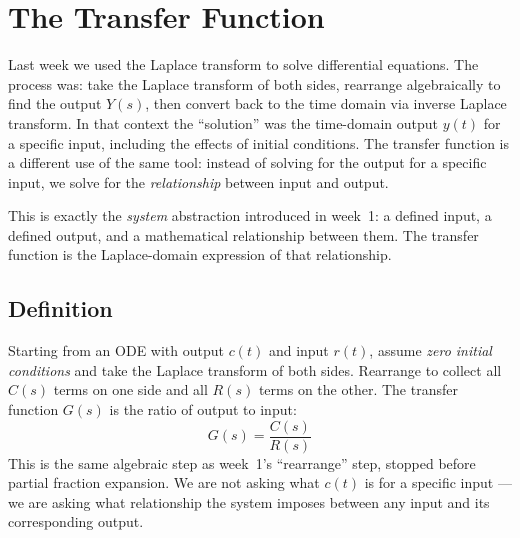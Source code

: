 \documentclass[../../book.tex]{subfiles}
\begin{document}

\section{The Transfer Function}
\label{sec:tf}

Last week we used the Laplace transform to solve differential equations.  The
process was: take the Laplace transform of both sides, rearrange algebraically
to find the output $Y(s)$, then convert back to the time domain via inverse Laplace transform.  In that
context the ``solution'' was the time-domain output $y(t)$ for a specific input,
including the effects of initial conditions.  The transfer function is a
different use of the same tool: instead of solving for the output for a specific
input, we solve for the \emph{relationship} between input and output.

This is exactly the \emph{system} abstraction introduced in week~1: a defined
input, a defined output, and a mathematical relationship between them.  The
transfer function is the Laplace-domain expression of that relationship.

\subsection{Definition}
\label{sec:tf_def}

Starting from an ODE with output $c(t)$ and input $r(t)$, assume
\emph{zero initial conditions} and take the Laplace transform of both sides.
Rearrange to collect all $C(s)$ terms on one side and all $R(s)$ terms on
the other.  The transfer function $G(s)$ is the ratio of output to input:
\begin{equation}
  G(s) = \frac{C(s)}{R(s)}
  \label{eq:tf_def}
\end{equation}
This is the same algebraic step as week~1's ``rearrange'' step, stopped before
partial fraction expansion.  We are not asking what $c(t)$ is for a specific
input --- we are asking what relationship the system imposes between any input
and its corresponding output.
\end{document}
